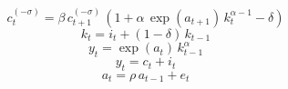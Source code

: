 \begin{dmath}
{c}_{t}^{\left(-{\sigma}\right)}={\beta}\, {c}_{t+1}^{\left(-{\sigma}\right)}\, \left(1+{\alpha}\, \exp\left({a}_{t+1}\right)\, {k}_{t}^{{\alpha}-1}-{\delta}\right)
\end{dmath}
\begin{dmath}
{k}_{t}={i}_{t}+\left(1-{\delta}\right)\, {k}_{t-1}
\end{dmath}
\begin{dmath}
{y}_{t}=\exp\left({a}_{t}\right)\, {k}_{t-1}^{{\alpha}}
\end{dmath}
\begin{dmath}
{y}_{t}={c}_{t}+{i}_{t}
\end{dmath}
\begin{dmath}
{a}_{t}={\rho}\, {a}_{t-1}+{e}_{t}
\end{dmath}
